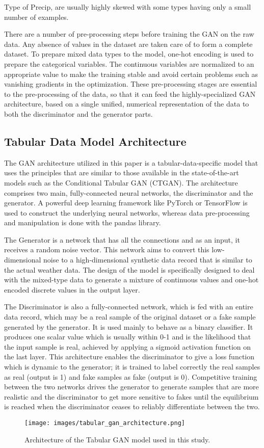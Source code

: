 \documentclass[12pt, draftclsnofoot, onecolumn]{IEEEtran}
\begin{document}
Type of Precip, are usually highly skewed with some types having only a small number of examples.  

There are a number of pre-processing steps before training the GAN on the raw data. Any absence of values in the dataset are taken care of to form a complete dataset. To prepare mixed data types to the model, one-hot encoding is used to prepare the categorical variables. The continuous variables are normalized to an appropriate value to make the training stable and avoid certain problems such as vanishing gradients in the optimization. These pre-processing stages are essential to the pre-processing of the data, so that it can feed the highly-specialized GAN architecture, based on a single unified, numerical representation of the data to both the discriminator and the generator parts.  

\subsection{Tabular Data Model Architecture}
The GAN architecture utilized in this paper is a tabular-data-specific model that uses the principles that are similar to those available in the state-of-the-art models such as the Conditional Tabular GAN (CTGAN). The architecture comprises two main, fully-connected neural networks, the discriminator and the generator. A powerful deep learning framework like PyTorch or TensorFlow is used to construct the underlying neural networks, whereas data pre-processing and manipulation is done with the pandas library.  

The Generator is a network that has all the connections and as an input, it receives a random noise vector. This network aims to convert this low-dimensional noise to a high-dimensional synthetic data record that is similar to the actual weather data. The design of the model is specifically designed to deal with the mixed-type data to generate a mixture of continuous values and one-hot encoded discrete values in the output layer.  

The Discriminator is also a fully-connected network, which is fed with an entire data record, which may be a real sample of the original dataset or a fake sample generated by the generator. It is used mainly to behave as a binary classifier. It produces one scalar value which is usually within 0-1 and is the likelihood that the input sample is real, achieved by applying a sigmoid activation function on the last layer. This architecture enables the discriminator to give a loss function which is dynamic to the generator; it is trained to label correctly the real samples as real (output is 1) and fake samples as fake (output is 0). Competitive training between the two networks drives the generator to generate samples that are more realistic and the discriminator to get more sensitive to fakes until the equilibrium is reached when the discriminator ceases to reliably differentiate between the two.  
\begin{figure}[H]
    \centering
    \texttt{[image: images/tabular\_gan\_architecture.png]}
    \caption{Architecture of the Tabular GAN model used in this study.}
    \label{fig:tabular_gan}
\end{figure}
\end{document}

